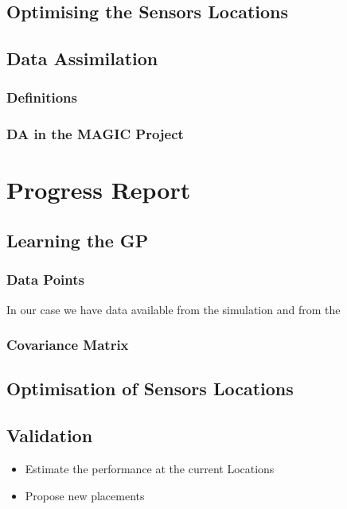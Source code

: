 \documentclass[11pt,a4paper]{article}
\numberwithin{equation}{section}
\begin{document}
\subsection{Optimising the Sensors Locations}

\subsection{Data Assimilation}

\subsubsection{Definitions}

\subsubsection{DA in the MAGIC Project}


\pagebreak
\section{Progress Report}

\subsection{Learning the GP}
\subsubsection{Data Points }
In our case we have data available from the simulation and from the 

\subsubsection{Covariance Matrix}


\subsection{Optimisation of Sensors Locations}

\subsection{Validation}

\begin{itemize}
	\item Estimate the performance at the current Locations
	\item Propose new placements 
\end{itemize}
\end{document}
